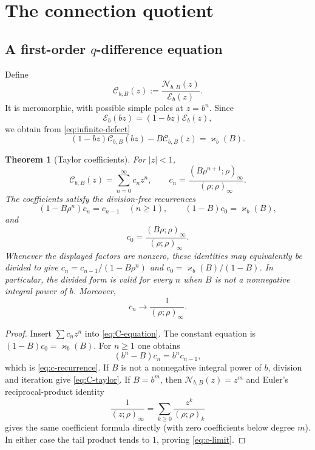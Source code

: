 \documentclass[11pt]{article}
\newtheorem{theorem}{Theorem}[section]
\theoremstyle{definition}
\newcommand{\Nker}{\mathscr{N}}
\newcommand{\Eker}{\mathscr{E}}
\newcommand{\Cker}{\mathscr{C}}
\newcommand{\kk}{\varkappa}
\newcommand{\qpf}[3]{\left(#1;#2\right)_{#3}}
\newcommand{\qpi}[2]{\left(#1;#2\right)_{\!\infty}}
\begin{document}
\section{The connection quotient}

\subsection{A first-order $q$-difference equation}

Define
\begin{equation}\label{eq:C-def}
 \Cker_{b,B}(z):=\frac{\Nker_{b,B}(z)}{\Eker_b(z)}.
\end{equation}
It is meromorphic, with possible simple poles at $z=b^n$.  Since
\begin{equation}\label{eq:E-scale}
 \Eker_b(bz)=(1-bz)\Eker_b(z),
\end{equation}
we obtain from \eqref{eq:infinite-defect}
\begin{equation}\label{eq:C-equation}
 (1-bz)\Cker_{b,B}(bz)-B\Cker_{b,B}(z)=\kk_b(B).
\end{equation}

\begin{theorem}[Taylor coefficients]\label{thm:C-taylor}
For $|z|<1$,
\begin{equation}\label{eq:C-taylor}
 \Cker_{b,B}(z)=\sum_{n=0}^{\infty}c_nz^n,
 \qquad
 c_n=\frac{\qpi{B\rho^{n+1}}{\rho}}{\qpi{\rho}{\rho}}.
\end{equation}
The coefficients satisfy the division-free recurrences
\begin{equation}\label{eq:c-recurrence}
 (1-B\rho^n)c_n=c_{n-1}\quad(n\ge1),
 \qquad
 (1-B)c_0=\kk_b(B),
\end{equation}
and
\[
 c_0=\frac{\qpi{B\rho}{\rho}}{\qpi{\rho}{\rho}}.
\]
Whenever the displayed factors are nonzero, these identities may equivalently be divided
to give $c_n=c_{n-1}/(1-B\rho^n)$ and
$c_0=\kk_b(B)/(1-B)$.  In particular, the divided form is valid for every $n$ when
$B$ is not a nonnegative integral power of $b$.
Moreover,
\begin{equation}\label{eq:c-limit}
 c_n\longrightarrow\frac1{\qpi{\rho}{\rho}}.
\end{equation}
\end{theorem}

\begin{proof}
Insert $\sum c_nz^n$ into \eqref{eq:C-equation}.  The constant equation is $(1-B)c_0=\kk_b(B)$.  For $n\ge1$ one obtains
\[
 (b^n-B)c_n=b^nc_{n-1},
\]
which is \eqref{eq:c-recurrence}.  If $B$ is not a nonnegative integral power of $b$,
division and iteration give \eqref{eq:C-taylor}.  If $B=b^m$, then
$\Nker_{b,B}(z)=z^m$ and Euler's reciprocal-product identity
\[
 \frac1{\qpi{z}{\rho}}=\sum_{k\ge0}\frac{z^k}{\qpf{\rho}{\rho}{k}}
\]
gives the same coefficient formula directly (with zero coefficients below degree $m$).
In either case the tail product tends to $1$, proving \eqref{eq:c-limit}.
\end{proof}
\end{document}
